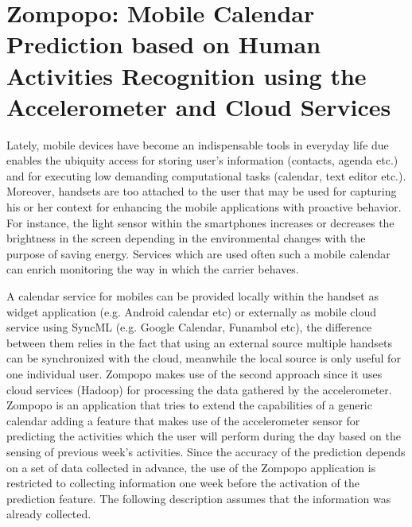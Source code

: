 

\section{Zompopo: Mobile Calendar Prediction based on Human Activities Recognition using the Accelerometer and Cloud Services}


Lately, mobile devices have become an indispensable tools in everyday life due enables the ubiquity access for storing user's information (contacts, agenda etc.) and for executing low demanding computational tasks (calendar, text editor etc.). Moreover, handsets are too attached to the user that may be used for capturing his or her context for enhancing the mobile applications with proactive behavior. For instance, the light sensor within the smartphones increases or decreases the brightness in the screen depending in the environmental changes with the purpose of saving energy. Services which are used often such a mobile calendar can enrich monitoring the way in which the carrier behaves.

A calendar service for mobiles can be provided locally within the handset as widget application (e.g. Android calendar etc) or externally as mobile cloud service using SyncML (e.g. Google Calendar, Funambol etc), the difference between them relies in the fact that using an external source multiple handsets can be synchronized with the cloud, meanwhile the local source is only useful for one individual user. Zompopo makes use of the second approach since it uses cloud services (Hadoop) for processing the data gathered by the accelerometer. Zompopo is an application that tries to extend the capabilities of a generic calendar adding a feature that makes use of the accelerometer sensor for predicting the activities which the user will perform during the day based on the sensing of previous week's activities. Since the accuracy of the prediction depends on a set of data collected in advance, the use of the Zompopo application is restricted to collecting information one week before the activation of the prediction feature. The following description assumes that the information was already collected.

